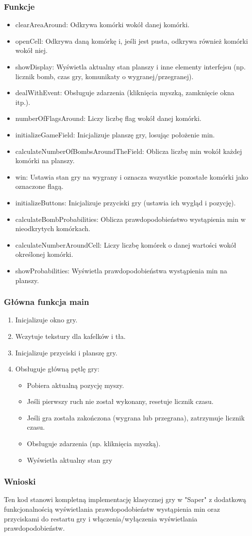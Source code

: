 \documentclass[a4paper, 10pt]{article}
\begin{document}
\subsubsection{Funkcje}
\begin{itemize}
	\item clearAreaAround: Odkrywa komórki wokół danej komórki.
	\item openCell: Odkrywa daną komórkę i, jeśli jest pusta, odkrywa również komórki wokół niej.
	\item showDisplay: Wyświetla aktualny stan planszy i inne elementy interfejsu (np. licznik bomb, czas gry, komunikaty o wygranej/przegranej).
	\item dealWithEvent: Obsługuje zdarzenia (kliknięcia myszką, zamknięcie okna itp.).
	\item numberOfFlagsAround: Liczy liczbę flag wokół danej komórki.
	\item initializeGameField: Inicjalizuje planszę gry, losując położenie min.
	\item calculateNumberOfBombsAroundTheField: Oblicza liczbę min wokół każdej komórki na planszy.
	\item win: Ustawia stan gry na wygrany i oznacza wszystkie pozostałe komórki jako oznaczone flagą.
	\item initializeButtons: Inicjalizuje przyciski gry (ustawia ich wygląd i pozycję).
	\item calculateBombProbabilities: Oblicza prawdopodobieństwo wystąpienia min w nieodkrytych komórkach.
	\item calculateNumberAroundCell: Liczy liczbę komórek o danej wartości wokół określonej komórki.
	\item showProbabilities: Wyświetla prawdopodobieństwa wystąpienia min na planszy.
\end{itemize}

\subsubsection{Główna funkcja \textbf{main}}
\begin{enumerate}
	\item Inicjalizuje okno gry.
	\item Wczytuje tekstury dla kafelków i tła.
	\item Inicjalizuje przyciski i planszę gry.
	\item Obsługuje główną pętlę gry:
		\begin{itemize}
			\item Pobiera aktualną pozycję myszy.
			\item Jeśli pierwszy ruch nie został wykonany, resetuje licznik czasu.
			\item Jeśli gra została zakończona (wygrana lub przegrana), zatrzymuje licznik czasu.
			\item Obsługuje zdarzenia (np. kliknięcia myszką).
			\item Wyświetla aktualny stan gry
		\end{itemize}
\end{enumerate}
\subsubsection{Wnioski}
Ten kod stanowi kompletną implementację klasycznej gry w "Saper" z dodatkową funkcjonalnością wyświetlania prawdopodobieństw wystąpienia min oraz przyciskami do restartu gry i włączenia/wyłączenia wyświetlania prawdopodobieństw.
\end{document}
